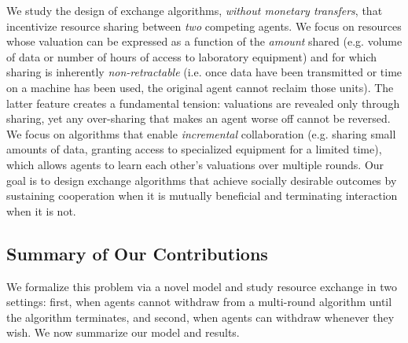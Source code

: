 We study the design of exchange algorithms, \emph{without monetary transfers}, that incentivize resource sharing between \emph{two} 
competing agents. We focus on resources whose valuation can be expressed as a function of the \emph{amount} shared 
(e.g. volume of data or number of hours of access to laboratory equipment) and for which sharing is inherently \emph{non-retractable} 
(i.e. once data have been transmitted or time on a machine has been used, the original agent cannot reclaim those units).
The latter feature creates a fundamental tension: valuations are revealed only through sharing, yet any over-sharing 
that makes an agent worse off cannot be reversed.
%
We focus on algorithms that enable \emph{incremental} collaboration (e.g. sharing small amounts of data, granting access 
to specialized equipment for a limited time), which allows agents to learn each other's valuations over multiple rounds. 
Our goal is to design exchange algorithms that achieve socially desirable outcomes by sustaining cooperation when it is mutually beneficial
and terminating interaction when it is not.


\subsection{Summary of Our Contributions}

We formalize this problem via a novel model and study resource exchange in two settings: first, when agents cannot withdraw from 
a multi-round algorithm until the algorithm terminates, and second, when agents can withdraw whenever they wish. 
We now summarize our model and results.


